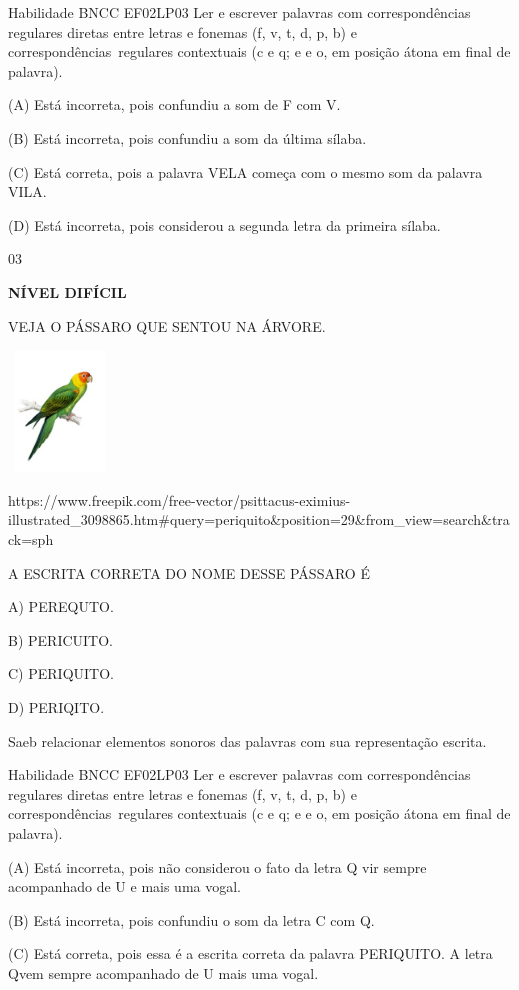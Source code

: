 {{Habilidade BNCC EF02LP03 Ler e escrever palavras com correspondências
regulares diretas entre letras e fonemas (f, v, t, d, p, b) e
correspondências~regulares contextuais (c e q; e e o, em posição átona
em final de palavra).

(A) Está incorreta, pois confundiu a som de F com V.

(B) Está incorreta, pois confundiu a som da última sílaba.

(C) Está correta, pois a palavra VELA começa com o mesmo som da palavra
VILA.

(D) Está incorreta, pois considerou a segunda letra da primeira sílaba.

\num{03}

\textbf{NÍVEL DIFÍCIL}

VEJA O PÁSSARO QUE SENTOU NA ÁRVORE.

\includegraphics[width=1.08542in,height=1.27222in]{media/image165.jpeg}

https://www.freepik.com/free-vector/psittacus-eximius-illustrated\_3098865.htm\#query=periquito\&position=29\&from\_view=search\&track=sph

A ESCRITA CORRETA DO NOME DESSE PÁSSARO É

A) PEREQUTO.

B) PERICUITO.

C) PERIQUITO.

D) PERIQITO.

Saeb relacionar elementos sonoros das palavras com sua representação
escrita.

Habilidade BNCC EF02LP03 Ler e escrever palavras com correspondências
regulares diretas entre letras e fonemas (f, v, t, d, p, b) e
correspondências~regulares contextuais (c e q; e e o, em posição átona
em final de palavra).

(A) Está incorreta, pois não considerou o fato da letra Q vir sempre
acompanhado de U e mais uma vogal.

(B) Está incorreta, pois confundiu o som da letra C com Q.

(C) Está correta, pois essa é a escrita correta da palavra PERIQUITO. A
letra Qvem sempre acompanhado de U mais uma vogal.

}}
